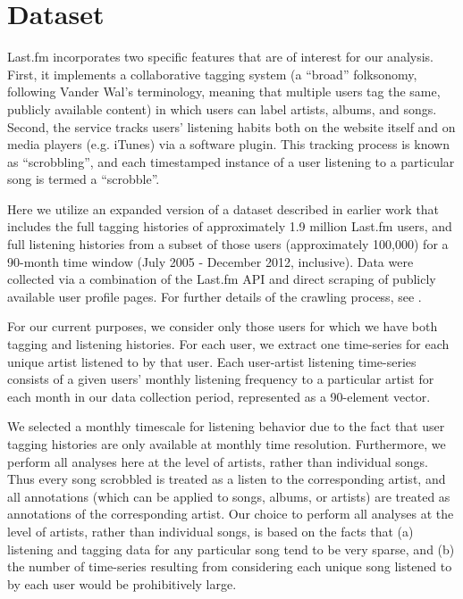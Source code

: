 \section{Dataset}
\label{sec_dataset}
Last.fm incorporates two specific features that are of interest for our analysis. First, it implements a collaborative tagging system (a ``broad'' folksonomy, following Vander Wal's \cite{VanderWal2005} terminology, meaning that multiple users tag the same, publicly available content) in which users can label artists, albums, and songs. Second, the service tracks users' listening habits both on the website itself and on media players (e.g. iTunes) via a software plugin. This tracking process is known as ``scrobbling'', and each timestamped instance of a user listening to a particular song is termed a ``scrobble''.

Here we utilize an expanded version of a dataset described in earlier work \cite{Lorince2013,Lorince2014} that includes the full tagging histories of approximately 1.9 million Last.fm users, and full listening histories from a subset of those users (approximately 100,000) for a 90-month time window (July 2005 - December 2012, inclusive). Data were collected via a combination of the Last.fm API and direct scraping of publicly available user profile pages. For further details of the crawling process, see \cite{Lorince2013,Lorince2014}.

For our current purposes, we consider only those users for which we have both tagging and listening histories. For each user, we extract one time-series for each unique artist listened to by that user. Each user-artist listening time-series consists of a given users' monthly listening frequency to a particular artist for each month in our data collection period, represented as a 90-element vector.

We selected a monthly timescale for listening behavior due to the fact that user tagging histories are only available at monthly time resolution. Furthermore, we perform all analyses here at the level of artists, rather than individual songs. Thus every song scrobbled is treated as a listen to the corresponding artist, and all annotations (which can be applied to songs, albums, or artists) are treated as annotations of the corresponding artist. Our choice to perform all analyses at the level of artists, rather than individual songs, is based on the facts that (a) listening and tagging data for any particular song tend to be very sparse, and (b) the number of time-series resulting from considering each unique song listened to by each user would be prohibitively large.

